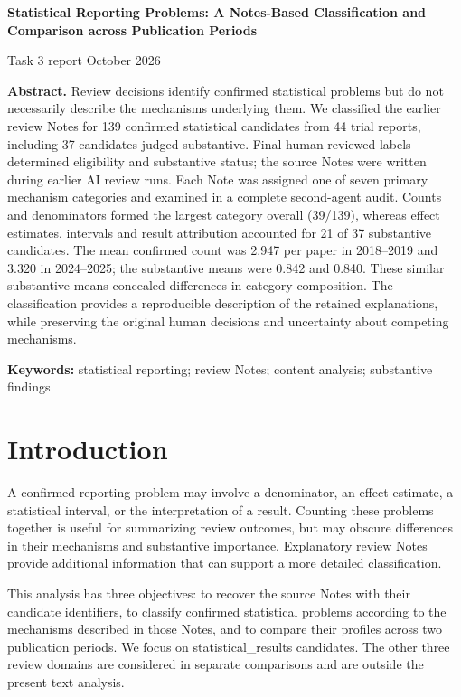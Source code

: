 \documentclass[11pt,a4paper]{article}
\begin{document}
\raggedright

{\sffamily\bfseries\color{Navy}\LARGE Statistical Reporting Problems: A Notes-Based Classification and Comparison across Publication Periods\par}
{\color{Slate}Task 3 report  October 2026\par}
\medskip
\textbf{Abstract.} Review decisions identify confirmed statistical problems but do not necessarily describe the mechanisms underlying them. We classified the earlier review Notes for 139 confirmed statistical candidates from 44 trial reports, including 37 candidates judged substantive. Final human-reviewed labels determined eligibility and substantive status; the source Notes were written during earlier AI review runs. Each Note was assigned one of seven primary mechanism categories and examined in a complete second-agent audit. Counts and denominators formed the largest category overall (39/139), whereas effect estimates, intervals and result attribution accounted for 21 of 37 substantive candidates. The mean confirmed count was 2.947 per paper in 2018–2019 and 3.320 in 2024–2025; the substantive means were 0.842 and 0.840. These similar substantive means concealed differences in category composition. The classification provides a reproducible description of the retained explanations, while preserving the original human decisions and uncertainty about competing mechanisms.\par
\textbf{Keywords:} statistical reporting; review Notes; content analysis; substantive findings\par
\section{Introduction}
A confirmed reporting problem may involve a denominator, an effect estimate, a statistical interval, or the interpretation of a result. Counting these problems together is useful for summarizing review outcomes, but may obscure differences in their mechanisms and substantive importance. Explanatory review Notes provide additional information that can support a more detailed classification.\par
This analysis has three objectives: to recover the source Notes with their candidate identifiers, to classify confirmed statistical problems according to the mechanisms described in those Notes, and to compare their profiles across two publication periods. We focus on statistical\_\allowbreak{}results candidates. The other three review domains are considered in separate comparisons and are outside the present text analysis.\par
\end{document}
